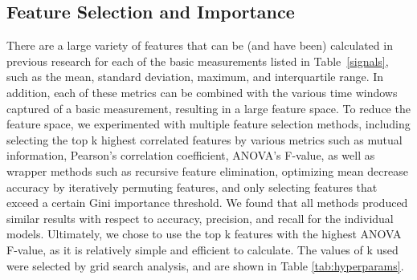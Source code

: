 

\subsection{Feature Selection and Importance}
There are a large variety of features that can be (and have been) calculated in previous research for each of the basic measurements listed in Table~\ref{signals}, such as the mean, standard deviation, maximum, and interquartile range. In addition, each of these metrics can be combined with the various time windows captured of a basic measurement, resulting in a large feature space. To reduce the feature space, we experimented with multiple feature selection methods, including selecting the top k highest correlated features by various metrics such as mutual information, Pearson's correlation coefficient, ANOVA's F-value, as well as wrapper methods such as recursive feature elimination, optimizing mean decrease accuracy by iteratively permuting features, and only selecting features that exceed a certain Gini importance threshold. We found that all methods produced similar results with respect to accuracy, precision, and recall for the individual models. Ultimately, we chose to use the top k features with the highest ANOVA F-value, as it is relatively simple and efficient to calculate. The values of k used were selected by grid search analysis, and are shown in Table \ref{tab:hyperparams}. 

